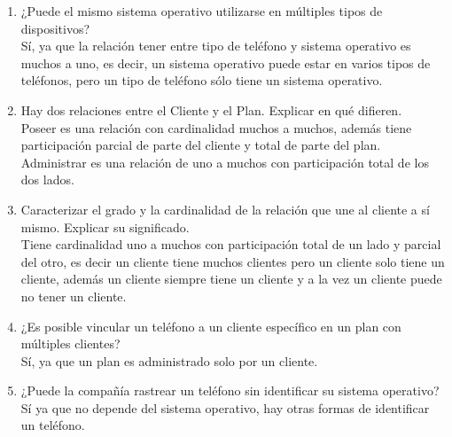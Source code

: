 \documentclass[a4paper, 12pt]{report}
\begin{document}
\begin{enumerate}
{\begin{enumerate}
{\begin{enumerate}
            los datos del teléfono.
            \item ¿Puede el mismo sistema operativo utilizarse en
            múltiples tipos de dispositivos?\\
            Sí, ya que la relación tener entre tipo de teléfono y
            sistema operativo es muchos a uno, es decir, un sistema
            operativo puede estar en varios tipos de teléfonos, pero
            un tipo de teléfono sólo tiene un sistema operativo.
            \item Hay dos relaciones entre el Cliente y el Plan. Explicar en qué
                difieren.\\
            Poseer es una relación con cardinalidad muchos a muchos,
            además tiene participación parcial de parte del cliente y
            total de parte del plan.\\
            Administrar es una relación de uno a muchos con
            participación total de los dos lados.
            \item Caracterizar el grado y la cardinalidad de la
            relación que une al cliente a sí mismo. Explicar su
            significado.\\
            Tiene cardinalidad uno a muchos con participación total de
            un lado y parcial del otro, es decir un cliente tiene muchos
            clientes pero un cliente solo tiene un cliente,
            además un cliente siempre tiene un cliente y a la vez un
            cliente puede no tener un cliente.
            \item ¿Es posible vincular un teléfono a un cliente
            específico en un plan con múltiples clientes?\\
            Sí, ya que un plan es administrado solo por un cliente.
            \item ¿Puede la compañía rastrear un teléfono sin identificar su
            sistema operativo?\\
            Sí ya que no depende del sistema operativo, hay otras
            formas de identificar un teléfono.

        \end{enumerate}
    }
\end{enumerate}
}
\end{enumerate}


\begin{thebibliography}{20}
\end{thebibliography}
\end{document}
